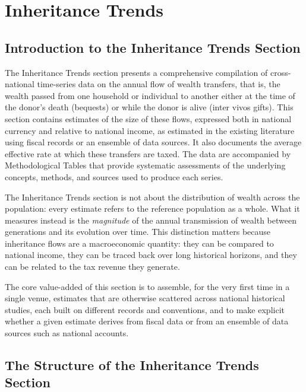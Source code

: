 \documentclass[
]{article}
\author{}
\date{\vspace{-2.5em}}
\begin{document}
\section{Inheritance Trends}\label{sec:inhe}

\subsection{Introduction to the Inheritance Trends
Section}\label{introduction-to-the-inheritance-trends-section}

The Inheritance Trends section presents a comprehensive compilation of
cross-national time-series data on the annual flow of wealth transfers,
that is, the wealth passed from one household or individual to another
either at the time of the donor's death (bequests) or while the donor is
alive (inter vivos gifts). This section contains estimates of the size
of these flows, expressed both in national currency and relative to
national income, as estimated in the existing literature using fiscal
records or an ensemble of data sources. It also documents the average
effective rate at which these transfers are taxed. The data are
accompanied by Methodological Tables that provide systematic assessments
of the underlying concepts, methods, and sources used to produce each
series.

The Inheritance Trends section is not about the distribution of wealth
across the population: every estimate refers to the reference population
as a whole. What it measures instead is the \emph{magnitude} of the
annual transmission of wealth between generations and its evolution over
time. This distinction matters because inheritance flows are a
macroeconomic quantity: they can be compared to national income, they
can be traced back over long historical horizons, and they can be
related to the tax revenue they generate.

The core value-added of this section is to assemble, for the very first
time in a single venue, estimates that are otherwise scattered across
national historical studies, each built on different records and
conventions, and to make explicit whether a given estimate derives from
fiscal data or from an ensemble of data sources such as national
accounts.

\subsection{The Structure of the Inheritance Trends
Section}\label{the-structure-of-the-inheritance-trends-section}
\end{document}
